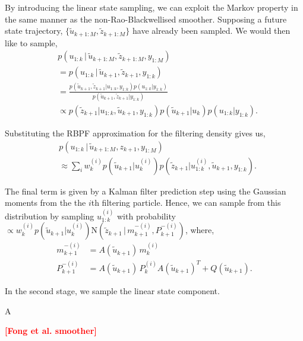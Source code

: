 \documentclass[twocolumn]{autart}    %
\newcommand{\comment}[1]{\textcolor{red}{\textbf{[#1]}}}
\begin{document}
By introducing the linear state sampling, we can exploit the Markov property in the same manner as the non-Rao-Blackwellised smoother. Supposing a future state trajectory, $\{ \tilde{u}_{k+1:M}, \tilde{z}_{k+1:M} \}$ have already been sampled. We would then like to sample,
%
\begin{equation}
\begin{split}
  &p(u_{1:k}\,|\,\tilde{u}_{k+1:M}, \tilde{z}_{k+1:M},y_{1:M}) \\
  &= p(u_{1:k}\,|\,\tilde{u}_{k+1},\tilde{z}_{k+1},y_{1:k}) \\
  &= \frac{ p(\tilde{u}_{k+1}, \tilde{z}_{k+1} | u_{1:k}, y_{1:k}) p(u_{1:k}|y_{1:k}) }{ p(\tilde{u}_{k+1}, \tilde{z}_{k+1} | y_{1:k}) } \\
  &\propto p(\tilde{z}_{k+1} | u_{1:k}, \tilde{u}_{k+1}, y_{1:k}) p(\tilde{u}_{k+1} | u_k) p(u_{1:k}|y_{1:k})     .
\end{split}
\end{equation}

Substituting the RBPF approximation for the filtering density gives us,
%
\begin{equation}
\begin{split}
  &p(u_{1:k}\,|\,\tilde{u}_{k+1:M},z_{k+1},y_{1:M}) \\
  &\approx \sum_i w_k^{(i)} p(\tilde{u}_{k+1} | u_k^{(i)}) p(\tilde{z}_{k+1} | u_{1:k}^{(i)}, \tilde{u}_{k+1}, y_{1:k})    .
\end{split}
\end{equation}

The final term is given by a Kalman filter prediction step using the Gaussian moments from the the $i$th filtering particle. Hence, we can sample from this distribution by sampling $u_{1:k}^{(i)}$ with probability $\propto w_k^{(i)} p(\tilde{u}_{k+1} | u_k^{(i)}) \mathrm{N}(\tilde{z}_{k+1}\,|\, m^{-(i)}_{k+1}, P^{-(i)}_{k+1})$, where,
%
\begin{equation}
\begin{split}
 m^{-(i)}_{k+1} &= A(\tilde{u}_{k+1}) \, m^{(i)}_{k} \\
 P^{-(i)}_{k+1} &= A(\tilde{u}_{k+1}) \, P^{(i)}_{k} A(\tilde{u}_{k+1})^T + Q(\tilde{u}_{k+1})     .
\end{split}
\end{equation}

In the second stage, we sample the linear state component. 

A

\comment{Fong et al. smoother}
\end{document}

